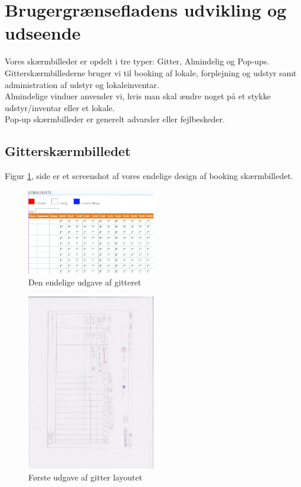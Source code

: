 \section{Brugergrænsefladens udvikling og udseende}
\label{Design_G_Development}
Vores skærmbilleder er opdelt i tre typer: Gitter, Almindelig og Pop-ups. 
\\Gitterskærmbillederne bruger vi til booking af lokale, forplejning og udstyr samt administration af udstyr og lokaleinventar.
\\Almindelige vinduer anvender vi, hvis man skal ændre noget på et stykke udstyr/inventar eller et lokale.
\\Pop-up skærmbilleder er generelt advarsler eller fejlbeskeder.

\subsection{Gitterskærmbilledet}
\label{Design_G_Development_Grid}
Figur \ref{Design_G_Development_FinalGrid}, side \pageref{Design_G_Development_FinalGrid} er et screenshot af vores endelige design af booking skærmbilledet.

\begin{figure}[h!]
  \centering
    \includegraphics[width=0.5\textwidth]{Appendix/GUI-Prototype/DigitalMockup/GridEksempel}
  \caption{Den endelige udgave af gitteret}
\label{Design_G_Development_FinalGrid}
\end{figure}

\begin{figure}[h!]
  \centering
    \includegraphics[width=0.5\textwidth, angle=90]{Appendix/GUI-Prototype/PaperMockup/LokaleListe_001}
  \caption{Første udgave af gitter layoutet}
\label{Design_G_Development_FirstGrid}
\end{figure}

